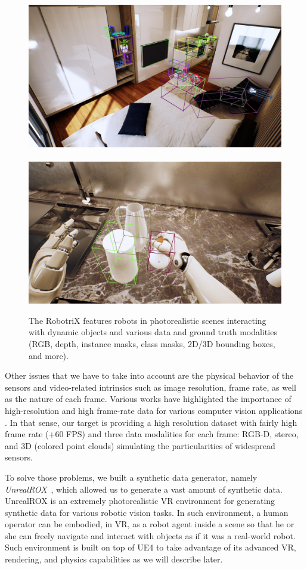 \begin{figure}[!htb]
    \includegraphics[width=0.48\linewidth]{Figures/Sim2Real/header_bbox}~
    \includegraphics[width=0.48\linewidth]{Figures/Sim2Real/header_bbox_2}
    \caption{The RobotriX features robots in photorealistic scenes interacting with dynamic objects and various data and ground truth modalities (RGB, depth, instance masks, class masks, 2D/3D bounding boxes, and more).}
    \label{fig:sim2real:robotrix}
\end{figure}

\clearpage

Other issues that we have to take into account are the physical behavior of the sensors and video-related intrinsics such as image resolution, frame rate, as well as the nature of each frame. Various works have highlighted the importance of high-resolution and high frame-rate data for various computer vision applications \cite{Handa2012}\cite{Held2016}. In that sense, our target is providing a high resolution dataset with fairly high frame rate (+60 FPS) and three data modalities for each frame: RGB-D, stereo, and 3D (colored point clouds) simulating the particularities of widespread sensors.

To solve those problems, we built a synthetic data generator, namely \emph{UnrealROX}~\cite{Martinez-Gonzalez2018}, which allowed us to generate a vast amount of synthetic data. UnrealROX is an extremely  photorealistic \ac{VR} environment for generating synthetic data for various robotic vision tasks. In such environment, a human operator can be embodied, in \acl{VR}, as a robot agent inside a scene so that he or she can freely navigate and interact with objects as if it was a real-world robot. Such environment is built on top of \ac{UE4} to take advantage of its advanced \ac{VR}, rendering, and physics capabilities as we will describe later.

